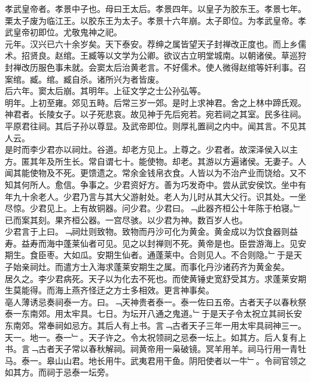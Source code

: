 \documentclass{zhvt-classic}
\begin{document}

\hspace*{2em}孝武皇帝者。孝景中子也。母曰王太后。孝景四年。以皇子为胶东王。孝景七年。栗太子废为临江王。以胶东王为太子。孝景十六年崩。太子即位。为孝武皇帝。孝武皇帝初即位。尤敬鬼神之祀。\\
\hspace*{2em}元年。汉兴已六十余岁矣。天下泰安。荐绅之属皆望天子封禅改正度也。而上乡儒术。招贤良。赵绾。王臧等以文学为公卿。欲议古立明堂城南。以朝诸侯。草巡狩封禅改历服色事未就。会窦太后治黄老言。不好儒术。使人微得赵绾等奸利事。召案绾。臧。绾。臧自杀。诸所兴为者皆废。\\
\hspace*{2em}后六年。窦太后崩。其明年。上征文学之士公孙弘等。\\
\hspace*{2em}明年。上初至雍。郊见五畤。后常三岁一郊。是时上求神君。舍之上林中蹄氏观。神君者。长陵女子。以子死悲哀。故见神于先后宛若。宛若祠之其室。民多往祠。平原君往祠。其后子孙以尊显。及武帝即位。则厚礼置祠之内中。闻其言。不见其人云。\\
\hspace*{2em}是时而李少君亦以祠灶。谷道。却老方见上。上尊之。少君者。故深泽侯入以主方。匿其年及所生长。常自谓七十。能使物。却老。其游以方遍诸侯。无妻子。人闻其能使物及不死。更馈遗之。常余金钱帛衣食。人皆以为不治产业而饶给。又不知其何所人。愈信。争事之。少君资好方。善为巧发奇中。尝从武安侯饮。坐中有年九十余老人。少君乃言与其大父游射处。老人为儿时从其大父行。识其处。一坐尽惊。少君见上。上有故铜器。问少君。少君曰。﹁此器齐桓公十年陈于柏寝。﹂已而案其刻。果齐桓公器。一宫尽骇。以少君为神。数百岁人也。\\
\hspace*{2em}少君言于上曰。﹁祠灶则致物。致物而丹沙可化为黄金。黄金成以为饮食器则益寿。益寿而海中蓬莱仙者可见。见之以封禅则不死。黄帝是也。臣尝游海上。见安期生。食臣枣。大如瓜。安期生仙者。通蓬莱中。合则见人。不合则隐。﹂于是天子始亲祠灶。而遣方士入海求蓬莱安期生之属。而事化丹沙诸药齐为黄金矣。\\
\hspace*{2em}居久之。李少君病死。天子以为化去不死也。而使黄锤史宽舒受其方。求蓬莱安期生莫能得。而海上燕齐怪迂之方士多相效。更言神事矣。\\
\hspace*{2em}亳人薄诱忌奏祠泰一方。曰。﹁天神贵者泰一。泰一佐曰五帝。古者天子以春秋祭泰一东南郊。用太牢具。七日。为坛开八通之鬼道。﹂于是天子令太祝立其祠长安东南郊。常奉祠如忌方。其后人有上书。言﹁古者天子三年一用太牢具祠神三一。天一。地一。泰一﹂。天子许之。令太祝领祠之忌泰一坛上。如其方。后人复有上书。言﹁古者天子常以春秋解祠。祠黄帝用一枭破镜。冥羊用羊。祠马行用一青牡马。泰一。皋山山君。地长用牛。武夷君用干鱼。阴阳使者以一牛﹂。令祠官领之如其方。而祠于忌泰一坛旁。\\
\end{document}
